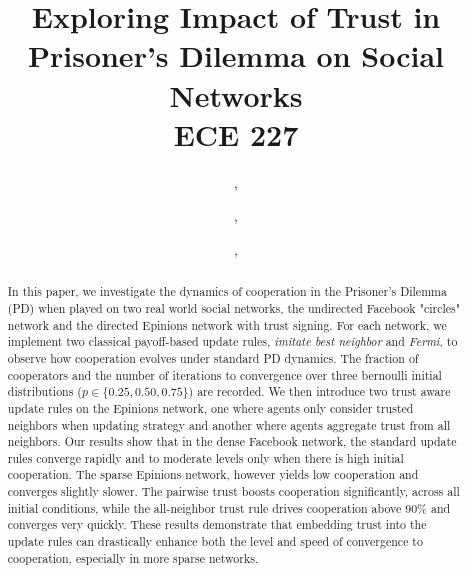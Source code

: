 \documentclass[journal]{IEEEtran}
\begin{document}
\title{Exploring Impact of Trust in Prisoner's Dilemma on Social Networks\\ \Large ECE 227}
        
    \author{
    ,

    \and
    
    ,
    \and
    
    ,
    }
    
\maketitle
\begin{abstract}
In this paper, we investigate the dynamics of cooperation in the Prisoner's Dilemma (PD) when played on two real world social networks, the undirected Facebook "circles" network and the directed Epinions network with trust signing.
For each network, we implement two classical payoff-based update rules, \emph{imitate best neighbor} and \emph{Fermi}, to observe how cooperation evolves under standard PD dynamics.
The fraction of cooperators and the number of iterations to convergence over three bernoulli initial distributions (\(p \in \{0.25, 0.50, 0.75\}\)) are recorded.
We then introduce two trust aware update rules on the Epinions network, one where agents only consider trusted neighbors when updating strategy and another where agents aggregate trust from all neighbors.
Our results show that in the dense Facebook network, the standard update rules converge rapidly and to moderate levels only when there is high initial cooperation.
The sparse Epinions network, however yields low cooperation and converges slightly slower.
The pairwise trust boosts cooperation significantly, across all initial conditions, while the all-neighbor trust rule drives cooperation above 90\% and converges very quickly.
These results demonstrate that embedding trust into the update rules can drastically enhance both the level and speed of convergence to cooperation, especially in more sparse networks.
\end{abstract}
\end{document}
